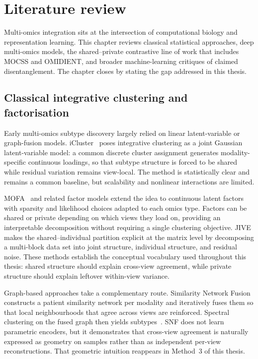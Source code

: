 \clearpage
\section{Literature review}
\label{sec:literature}

Multi-omics integration sits at the intersection of computational biology and representation learning. This chapter reviews classical statistical approaches, deep multi-omics models, the shared--private contrastive line of work that includes MOCSS and OMIDIENT, and broader machine-learning critiques of claimed disentanglement. The chapter closes by stating the gap addressed in this thesis.

\subsection{Classical integrative clustering and factorisation}

Early multi-omics subtype discovery largely relied on linear latent-variable or graph-fusion models. iCluster~\citep{shen2009integrative} poses integrative clustering as a joint Gaussian latent-variable model: a common discrete cluster assignment generates modality-specific continuous loadings, so that subtype structure is forced to be shared while residual variation remains view-local. The method is statistically clear and remains a common baseline, but scalability and nonlinear interactions are limited.

MOFA~\citep{argelaguet2018multi} and related factor models extend the idea to continuous latent factors with sparsity and likelihood choices adapted to each omics type. Factors can be shared or private depending on which views they load on, providing an interpretable decomposition without requiring a single clustering objective. JIVE~\citep{lock2013jive} makes the shared--individual partition explicit at the matrix level by decomposing a multi-block data set into joint structure, individual structure, and residual noise. These methods establish the conceptual vocabulary used throughout this thesis: shared structure should explain cross-view agreement, while private structure should explain leftover within-view variance.

Graph-based approaches take a complementary route. Similarity Network Fusion~\citep{wang2014snf} constructs a patient similarity network per modality and iteratively fuses them so that local neighbourhoods that agree across views are reinforced. Spectral clustering on the fused graph then yields subtypes~\citep{ng2002spectral,vonluxburg2007tutorial}. SNF does not learn parametric encoders, but it demonstrates that cross-view agreement is naturally expressed as geometry on samples rather than as independent per-view reconstructions. That geometric intuition reappears in Method~3 of this thesis.

